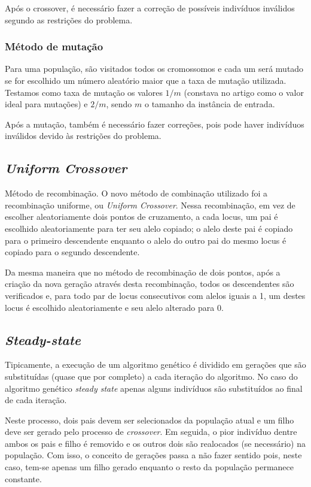 \documentclass[12pt,a4paper]{article}
\begin{document}
        Após o crossover, é necessário fazer a correção de possíveis indivíduos inválidos segundo as restrições do problema.

    \subsubsection{Método de mutação}

         Para uma população, são visitados todos os cromossomos e cada um será mutado se for escolhido um número aleatório maior que a taxa de mutação utilizada. Testamos como taxa de
         mutação os valores $1/m$ (constava no artigo como o valor ideal para mutações) e $2/m$, sendo $m$ o tamanho da instância de entrada.

        Após a mutação, também é necessário fazer correções, pois pode haver indivíduos inválidos devido às restrições do problema.

    \subsection{\textit{Uniform Crossover}}

        Método de recombinação. O novo método de combinação utilizado foi a recombinação uniforme, ou \textit{Uniform Crossover}. Nessa recombinação, em vez de escolher aleatoriamente dois
        pontos de cruzamento, a cada locus, um pai é escolhido aleatoriamente para ter seu alelo copiado; o alelo deste pai é copiado para o primeiro descendente enquanto o alelo do outro
        pai do mesmo locus é copiado para o segundo descendente.

        Da mesma maneira que no método de recombinação de dois pontos, após a criação da nova geração através desta recombinação, todos os descendentes são verificados e, para todo par de locus
        consecutivos com alelos iguais a 1, um destes locus é escolhido aleatoriamente e seu alelo alterado para 0.


    \subsection{\emph{Steady-state}}

        Tipicamente, a execução de um algoritmo genético é dividido em gerações que são substituídas (quase que por completo) a cada iteração do algoritmo. No caso do algoritmo genético \emph{steady
        state} apenas alguns indivíduos são substituídos ao final de cada iteração.

        Neste processo, dois pais devem ser selecionados da população atual e um filho deve ser gerado pelo processo de \emph{crossover}. Em seguida, o pior indivíduo dentre ambos os pais e filho é
        removido e os outros dois são realocados (se necessário) na população. Com isso, o conceito de gerações passa a não fazer sentido pois, neste caso, tem-se apenas um filho gerado enquanto o
        resto da população permanece constante.  
\end{document}
